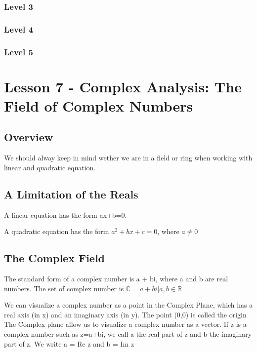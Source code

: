 \documentclass{article}
\begin{document}
\subsubsection{Level 3}
\subsubsection{Level 4}
\subsubsection{Level 5}
\pagebreak

\section{Lesson 7 - Complex Analysis: The Field of Complex Numbers}
\subsection{Overview}

We should alway keep in mind wether we are in a field or ring when working with
linear and quadratic equation.

\subsection{A Limitation of the Reals}

\begin{definition}
    A linear equation has the form ax+b=0.
\end{definition}

\begin{definition}
    A quadratic equation has the form $a^2 + bx + c =0 $, where $a \neq 0$
\end{definition}

\subsection{The Complex Field}

\begin{definition}
    The standard form of a complex number is a + bi, where a and b are real numbers.
    The set of complex number is $\mathbb{C} = {a + bi | a,b \in \mathbb{R}}$
\end{definition}

\begin{definition}
    We can visualize a complex number as a point in the Complex Plane, which has
    a real axis (in x) and an imaginary axis (in y). The point (0,0) is called
    the origin\\

    The Complex plane allow us to visualize a complex number as a vector. If
    z is a complex number such as z=a+bi, we call a the real part of z and b the
    imaginary part of z. We write a = Re z and b = Im z
\end{definition}
\end{document}
